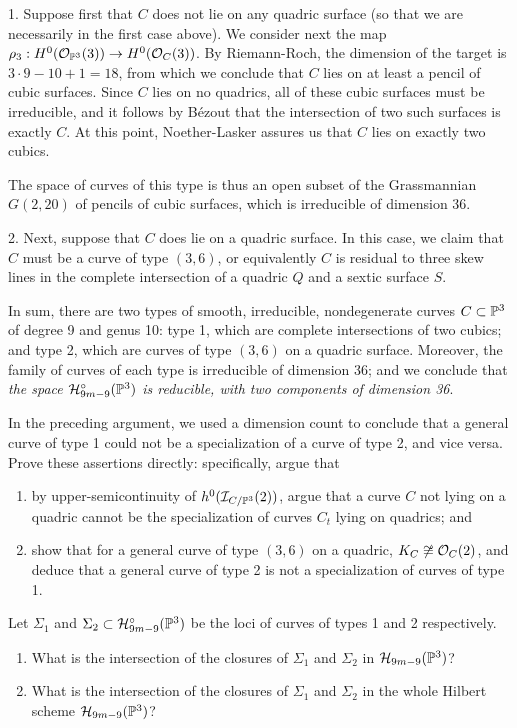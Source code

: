 1. Suppose first that $C$ does not lie on any quadric surface (so that we are necessarily in the first case above). We consider next the map $\rho_3 : H^0(\cO_{\PP^3}(3)) \to H^0(\cO_C(3))$. By Riemann-Roch, the dimension of the target is $3\cdot 9 - 10 + 1 = 18$, from which we conclude that $C$ lies on at least a pencil of cubic surfaces. Since $C$ lies on no quadrics, all of these cubic surfaces must be irreducible, and it follows by B\'ezout that the intersection of two such surfaces is exactly $C$. At this point, Noether-Lasker assures us that $C$ lies on exactly two cubics.

The space of curves of this type is thus an open subset of the Grassmannian $G(2,20)$ of pencils of cubic surfaces, which is irreducible of dimension 36.

2. Next, suppose that $C$ does lie on a quadric surface. In this case, we claim that $C$ must be a curve of type $(3,6)$, or equivalently $C$ is residual to three skew lines in the complete intersection of a quadric $Q$ and a sextic surface $S$.

In sum, there are two types of smooth, irreducible, nondegenerate curves $C \subset \PP^3$ of degree 9 and genus 10: type 1, which are complete intersections of two cubics; and type 2, which are curves of type $(3,6)$ on a quadric surface. Moreover, the family of curves of each type is irreducible of dimension 36; and we conclude that \emph{the space $\cH^\circ_{9m-9}(\PP^3)$ is reducible, with two components of dimension 36}.


\begin{exercise}
In the preceding argument, we used a dimension count to conclude that a general curve of type 1 could not be a specialization of a curve of type 2, and vice versa. Prove these assertions directly: specifically, argue that
\begin{enumerate}
\item by upper-semicontinuity of $h^0(\cI_{C/\PP^3}(2))$, argue that a curve $C$ not lying on a quadric cannot be the specialization of curves $C_t$ lying on quadrics; and
\item show that for a general curve of type $(3,6)$ on a quadric, $K_C \not\cong \cO_C(2)$, and deduce that a general curve of type 2 is not a specialization of curves of type 1.
\end{enumerate}
\end{exercise}

\begin{exercise}
Let $\Sigma_1$ and $\Sigma_2 \subset \cH^\circ_{9m-9}(\PP^3)$ be the loci of curves of types 1 and 2 respectively. 
\begin{enumerate}
\item What is the intersection of the closures of $\Sigma_1$ and $\Sigma_2$ in $\cH_{9m-9}(\PP^3)$?
\item What is the intersection of the closures of $\Sigma_1$ and $\Sigma_2$ in the whole Hilbert scheme $\cH_{9m-9}(\PP^3)$?
\end{enumerate}
\end{exercise}

